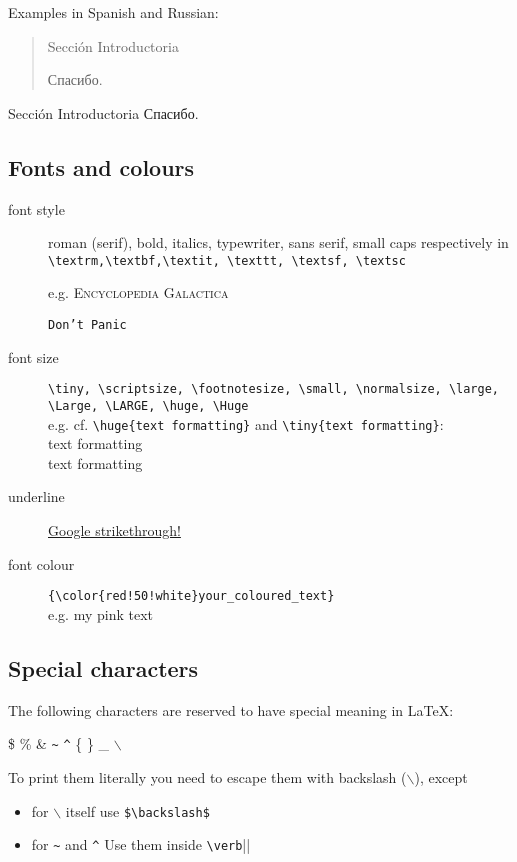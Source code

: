 \documentclass[a4paper,11pt,leqno]{article}
\begin{document}
Examples in Spanish and Russian:

\begin{center}
	\begin{quote}
		\foreignlanguage{spanish}{Sección Introductoria} 
		
		\foreignlanguage{russian}{Спасибо.}
	\end{quote}
	
	Sección Introductoria
	Спасибо.
\end{center}

\subsection{Fonts and colours}

\begin{description}
	\item[font style] roman (serif), bold, italics, typewriter, sans serif, small caps respectively in \\
	\verb|\textrm,\textbf,\textit, \texttt, \textsf, \textsc|
	
	e.g. \textsc{Encyclopedia Galactica} 
	
	\texttt{Don't Panic}
	
	\item[font size] \verb|\tiny, \scriptsize, \footnotesize, \small, \normalsize, \large, \Large, \LARGE, \huge, \Huge| \\
	e.g. cf. \verb|\huge{text formatting}| and \verb|\tiny{text formatting}|: \\
	\huge{text formatting} \\
	\tiny{text formatting}
	\normalsize
	
	\item[underline] \underline{Google strikethrough!}
	
	\item[font colour] \verb|{\color{red!50!white}your_coloured_text}| \\
	 e.g. {\color{red!50!white}my pink text}
 
\end{description}


\subsection{Special characters}
The following characters are reserved to have special meaning in \LaTeX:

\$ \% \& \verb|~| \verb|^| \{ \} \_ $\backslash$ 

To print them literally you need to escape them with backslash ($\backslash$), except
\begin{itemize}
	\item for $\backslash$ itself use \verb|$\backslash$|
	\item for \verb|~| and \verb|^| Use them inside \verb|\verb||| 
\end{itemize}
\end{document}
